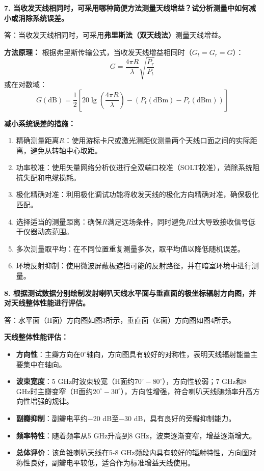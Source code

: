 \documentclass[12pt,a4paper]{article}
\begin{document}
\textbf{7. 当收发天线相同时，可采用哪种简便方法测量天线增益？试分析测量中如何减小或消除系统误差。}

答：当收发天线相同时，可采用\textbf{弗里斯法（双天线法）}测量天线增益。

\textbf{方法原理：}
根据弗里斯传输公式，当收发天线增益相同时（$G_t = G_r = G$）：
\begin{equation}
G = \frac{4\pi R}{\lambda}\sqrt{\frac{P_r}{P_t}}
\end{equation}
或在对数域：
\begin{equation}
G(\text{dB}) = \frac{1}{2}\left[20\lg\left(\frac{4\pi R}{\lambda}\right) - (P_t(\text{dBm}) - P_r(\text{dBm}))\right]
\end{equation}

\textbf{减小系统误差的措施：}
\begin{enumerate}
    \item 精确测量距离$R$：使用游标卡尺或激光测距仪测量两个天线口面之间的实际距离，避免从转轴中心取距。
    \item 功率校准：使用矢量网络分析仪进行全双端口校准（SOLT校准），消除系统阻抗失配和电缆损耗。
    \item 极化精确对准：利用极化调试功能将收发天线的极化方向精确对准，确保极化匹配。
    \item 选择适当的测量距离：确保$R$满足远场条件，同时避免$R$过大导致接收信号低于仪器动态范围。
    \item 多次测量取平均：在不同位置重复测量多次，取平均值以降低随机误差。
    \item 环境反射抑制：使用微波屏蔽板遮挡可能的反射路径，并在暗室环境中进行测量。
\end{enumerate}


\textbf{8. 根据测试数据分别绘制发射喇叭天线水平面与垂直面的极坐标辐射方向图，并对天线整体性能进行评估。}

答：水平面（H面）方向图如图3所示，垂直面（E面）方向图如图4所示。

\textbf{天线整体性能评估：}
\begin{itemize}
    \item \textbf{方向性}：主瓣方向在$0^\circ$轴向，方向图具有较好的对称性，表明天线辐射能量主要集中在轴向。
    \item \textbf{波束宽度}：5 GHz时波束较宽（H面约$70^\circ-80^\circ$），方向性较弱；7 GHz和8 GHz时主瓣变窄（H面约$20^\circ-30^\circ$），方向性增强，符合喇叭天线随频率升高方向性增强的规律。
    \item \textbf{副瓣抑制}：副瓣电平约$-20$ dB至$-30$ dB，具有良好的旁瓣抑制能力。
    \item \textbf{频率特性}：随着频率从5 GHz升高到8 GHz，波束逐渐变窄，增益逐渐增大。
    \item \textbf{总体评价}：该角锥喇叭天线在5-8 GHz频段内具有较好的辐射特性，方向图对称性良好，副瓣电平较低，适合作为标准增益天线使用。
\end{itemize}
\end{document}
